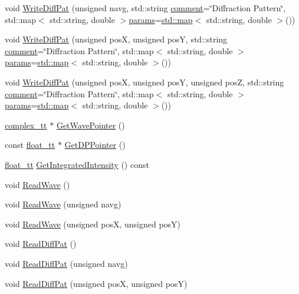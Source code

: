 \begin{DoxyCompactItemize}
\item 
void \hyperlink{class_q_s_t_e_m_1_1_c_base_wave_ab8d8e3b0147d1b0b614b4b03adfa146b}{Write\-Diff\-Pat} (unsigned navg, std\-::string \hyperlink{image_sim_8m_aea4cc4bd8e43a7f8ebf9b0ee3da8d681}{comment}=\char`\"{}Diffraction Pattern\char`\"{}, std\-::map$<$ std\-::string, double $>$\hyperlink{image_sim_8m_ad57b218fb254a1624c09ad71cb6b6415}{params}=\hyperlink{_displacement_params_8m_af619c74fd72bdb64d115463dff2720cd}{std\-::map}$<$ std\-::string, double $>$())
\item 
void \hyperlink{class_q_s_t_e_m_1_1_c_base_wave_a0952cf7c1694e3c4b11b1b237179cd75}{Write\-Diff\-Pat} (unsigned pos\-X, unsigned pos\-Y, std\-::string \hyperlink{image_sim_8m_aea4cc4bd8e43a7f8ebf9b0ee3da8d681}{comment}=\char`\"{}Diffraction Pattern\char`\"{}, std\-::map$<$ std\-::string, double $>$\hyperlink{image_sim_8m_ad57b218fb254a1624c09ad71cb6b6415}{params}=\hyperlink{_displacement_params_8m_af619c74fd72bdb64d115463dff2720cd}{std\-::map}$<$ std\-::string, double $>$())
\item 
void \hyperlink{class_q_s_t_e_m_1_1_c_base_wave_ad5bcd088fe7b44e347b7d747d57ea759}{Write\-Diff\-Pat} (unsigned pos\-X, unsigned pos\-Y, unsigned pos\-Z, std\-::string \hyperlink{image_sim_8m_aea4cc4bd8e43a7f8ebf9b0ee3da8d681}{comment}=\char`\"{}Diffraction Pattern\char`\"{}, std\-::map$<$ std\-::string, double $>$\hyperlink{image_sim_8m_ad57b218fb254a1624c09ad71cb6b6415}{params}=\hyperlink{_displacement_params_8m_af619c74fd72bdb64d115463dff2720cd}{std\-::map}$<$ std\-::string, double $>$())
\item 
\hyperlink{namespace_q_s_t_e_m_afa320ea3cd2f5ff080c422f81b803a32}{complex\-\_\-tt} $\ast$ \hyperlink{class_q_s_t_e_m_1_1_c_base_wave_a111d4e9e333116af453f05df079f78e8}{Get\-Wave\-Pointer} ()
\item 
const \hyperlink{namespace_q_s_t_e_m_a915d7caa497280d9f927c4ce8d330e47}{float\-\_\-tt} $\ast$ \hyperlink{class_q_s_t_e_m_1_1_c_base_wave_aadb8a8861e2807bfc48a0e6588e91bf7}{Get\-D\-P\-Pointer} ()
\item 
\hyperlink{namespace_q_s_t_e_m_a915d7caa497280d9f927c4ce8d330e47}{float\-\_\-tt} \hyperlink{class_q_s_t_e_m_1_1_c_base_wave_a8894584b48dd153f3236413f1e7f6419}{Get\-Integrated\-Intensity} () const 
\item 
void \hyperlink{class_q_s_t_e_m_1_1_c_base_wave_ac467deea510131aed760c72c6d298faa}{Read\-Wave} ()
\item 
void \hyperlink{class_q_s_t_e_m_1_1_c_base_wave_aadd3753d83c2e290082aa6b8c26fe395}{Read\-Wave} (unsigned navg)
\item 
void \hyperlink{class_q_s_t_e_m_1_1_c_base_wave_a4175bdb98f45a10f653ed8a5d433ebb5}{Read\-Wave} (unsigned pos\-X, unsigned pos\-Y)
\item 
void \hyperlink{class_q_s_t_e_m_1_1_c_base_wave_ae609db747080f3b174eb8943a7423c43}{Read\-Diff\-Pat} ()
\item 
void \hyperlink{class_q_s_t_e_m_1_1_c_base_wave_a5e6e4627690a346c8fae3e74b3549604}{Read\-Diff\-Pat} (unsigned navg)
\item 
void \hyperlink{class_q_s_t_e_m_1_1_c_base_wave_a5e8a1a373c6b858dcf6c251d1e53228a}{Read\-Diff\-Pat} (unsigned pos\-X, unsigned pos\-Y)
\end{DoxyCompactItemize}
